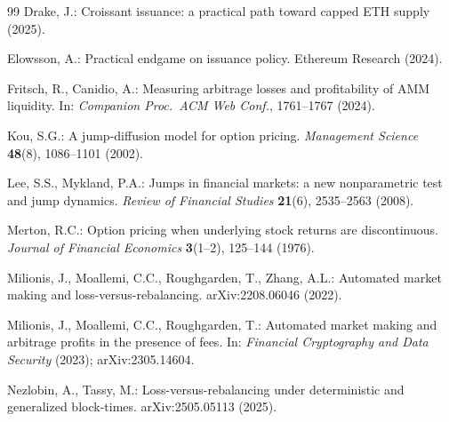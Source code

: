 \documentclass[11pt]{article}
\theoremstyle{definition}
\theoremstyle{remark}
\newcommand{\1}{\mathbf{1}}
\begin{document}
\begin{thebibliography}{99}
Drake, J.: Croissant issuance: a practical path toward capped ETH supply (2025).

Elowsson, A.: Practical endgame on issuance policy. Ethereum Research (2024).

Fritsch, R., Canidio, A.: Measuring arbitrage losses and profitability of AMM liquidity.
In: \emph{Companion Proc.\ ACM Web Conf.}, 1761--1767 (2024).

Kou, S.G.: A jump-diffusion model for option pricing.
\emph{Management Science} \textbf{48}(8), 1086--1101 (2002).

Lee, S.S., Mykland, P.A.:
Jumps in financial markets: a new nonparametric test and jump dynamics.
\emph{Review of Financial Studies} \textbf{21}(6), 2535--2563 (2008).

Merton, R.C.: Option pricing when underlying stock returns are discontinuous.
\emph{Journal of Financial Economics} \textbf{3}(1--2), 125--144 (1976).

Milionis, J., Moallemi, C.C., Roughgarden, T., Zhang, A.L.:
Automated market making and loss-versus-rebalancing. arXiv:2208.06046 (2022).

Milionis, J., Moallemi, C.C., Roughgarden, T.:
Automated market making and arbitrage profits in the presence of fees.
In: \emph{Financial Cryptography and Data Security} (2023); arXiv:2305.14604.

Nezlobin, A., Tassy, M.:
Loss-versus-rebalancing under deterministic and generalized block-times.
arXiv:2505.05113 (2025).

\end{thebibliography}
\end{document}
